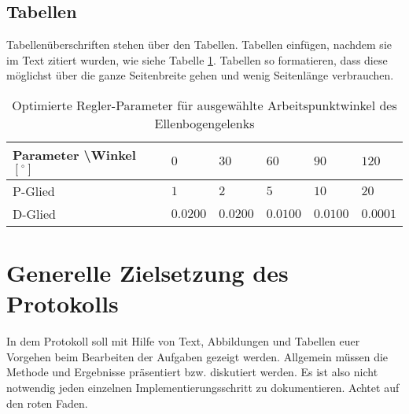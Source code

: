 \documentclass[a4paper, 12pt]{article}
\begin{document}
\subsection{Tabellen}
Tabellenüberschriften stehen über den Tabellen. Tabellen einfügen, nachdem sie im Text zitiert wurden, wie siehe Tabelle \ref{tab:opt_controller}. Tabellen so formatieren, dass diese möglichst über die ganze Seitenbreite gehen und wenig Seitenlänge verbrauchen.


\begin{table}[h]
    \centering
    \caption[Optimierte Regler-Parameter]{Optimierte Regler-Parameter für ausgewählte Arbeitspunktwinkel des Ellenbogengelenks}
    \label{tab:opt_controller}
    \begin{tabular}{llllll}
        \toprule
        Parameter  \textbackslash Winkel~$[^\circ]$ & $0$      & $30$     & $60$     & $90$     & $120$    \\
        \midrule
        P-Glied                                     & $1$      & $2$      & $5$      & $10$     & $20$     \\
        D-Glied                                     & $0.0200$ & $0.0200$ & $0.0100$ & $0.0100$ & $0.0001$ \\
        \bottomrule
    \end{tabular}
\end{table}

\section{Generelle Zielsetzung des Protokolls}
In dem Protokoll soll mit Hilfe von Text, Abbildungen und Tabellen euer Vorgehen beim Bearbeiten der Aufgaben gezeigt werden. Allgemein müssen die Methode und Ergebnisse präsentiert bzw. diskutiert werden. Es ist also nicht notwendig jeden einzelnen Implementierungsschritt zu dokumentieren. Achtet auf den roten Faden. 



\newpage
\listoffigures
\listoftables %
\newpage

\end{document}
